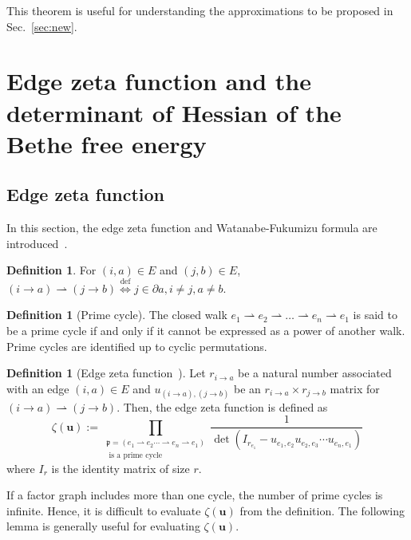 \documentclass[a4paper,10pt,twoside,twocolumn,openany,final]{memoir}
\theoremstyle{plain}
\theoremstyle{definition}
\newtheorem{definition}[theorem]{Definition}
\theoremstyle{remark}
\begin{document}
This theorem is useful for understanding the approximations to be proposed in Sec.~\ref{sec:new}.




\section{Edge zeta function and the determinant of Hessian of the Bethe free energy}
\subsection{Edge zeta function}
In this section, the edge zeta function and Watanabe-Fukumizu formula are introduced~\cite{watanabe2010thesis}.
\begin{definition}
For $(i,a)\in E$ and $(j, b)\in E$,
$(i\to a)\rightharpoonup (j\to b) \overset{\mathrm{def}}{\iff} j\in\partial a, i\ne j, a\ne b$.
\end{definition}

\begin{definition}[Prime cycle]
The closed walk $e_1\rightharpoonup e_2\rightharpoonup \dotsc \rightharpoonup e_n \rightharpoonup e_1$ is said to be a prime cycle
if and only if it cannot be expressed as a power of another walk.
Prime cycles are identified up to cyclic permutations.
\end{definition}

\begin{definition}[Edge zeta function~\cite{watanabe2010thesis}]
Let $r_{i\to a}$ be a natural number associated with an edge $(i, a)\in E$ and
$u_{(i\to a), (j\to b)}$ be an $r_{i\to a}\times r_{j\to b}$ matrix for $(i\to a)\rightharpoonup (j\to b)$.
Then, the edge zeta function is defined as
\begin{equation*}
\zeta(\bm{u}) := \prod_{\substack{\mathfrak{p}=(e_1\rightharpoonup e_2 \dotsb \rightharpoonup e_n \rightharpoonup e_1)\\ \text{ is a prime cycle}}}
\frac1{\det\left(I_{r_{e_1}}-u_{e_1,e_2}u_{e_2,e_3}\dotsm u_{e_n,e_1}\right)}
\end{equation*}
where $I_r$ is the identity matrix of size $r$.
\end{definition}

If a factor graph includes more than one cycle, the number of prime cycles is infinite.
Hence, it is difficult to evaluate $\zeta(\bm{u})$ from the definition.
The following lemma is generally useful for evaluating $\zeta(\bm{u})$.
\end{document}
